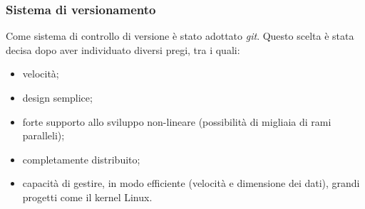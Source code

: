 \subsubsection{Sistema di versionamento}
Come sistema di controllo di versione è stato adottato \textit{git}. Questo scelta è stata decisa dopo aver individuato diversi pregi, tra i quali:
\begin{itemize}
\item velocità;
\item design semplice;
\item forte supporto allo sviluppo non-lineare (possibilità di migliaia di rami paralleli);
\item completamente distribuito;
\item capacità di gestire, in modo efficiente (velocità e dimensione dei dati), grandi progetti come il kernel Linux.
\end{itemize}

